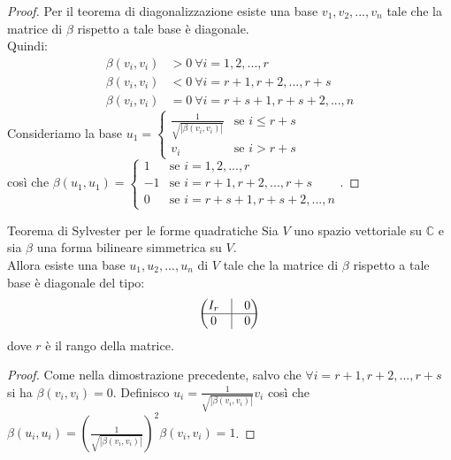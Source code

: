 \documentclass[a4paper]{article}
\theoremstyle{definition}
\begin{document}
	\begin{proof}
		Per il teorema di diagonalizzazione esiste una base $v_1, v_2, ..., v_n$ tale che la matrice di $\beta$ rispetto a tale base è diagonale. \\
		Quindi:
		\begin{align*}
			\beta(v_i, v_i) &> 0 \ \forall i = 1, 2, ..., r \\
			\beta(v_i, v_i) &< 0 \ \forall i = r + 1, r + 2, ..., r + s \\
			\beta(v_i, v_i) &= 0 \ \forall i = r + s + 1, r + s + 2, ..., n
		\end{align*}
		Consideriamo la base $u_1 = \begin{cases}
			\frac{1}{\sqrt{|\beta(v_i, v_i)|}} & \text{se } i \le r + s \\
			v_i & \text{se } i > r + s
		\end{cases}$ \\
		così che $\beta(u_1, u_1) = \begin{cases}
			1 & \text{se } i = 1, 2, ..., r \\
			-1 & \text{se } i = r + 1, r + 2, ..., r + s \\
			0 & \text{se } i = r + s + 1, r + s + 2, ..., n
		\end{cases}$.
	\end{proof}


	\begin{teo}{Teorema di Sylvester per le forme quadratiche}{}
		Sia $V$ uno spazio vettoriale su $\mathbb{C}$ e sia $\beta$ una forma bilineare simmetrica su $V$. \\
		Allora esiste una base $u_1, u_2, ..., u_n$ di $V$ tale che la matrice di $\beta$ rispetto a tale base è diagonale del tipo:
		\begin{align*}
			\begin{pmatrix}
				I_r & \vline & 0 \\
				\hline
				0 & \vline & 0
			\end{pmatrix}
		\end{align*}
		dove $r$ è il rango della matrice.
	\end{teo}

	\begin{proof}
		Come nella dimostrazione precedente, salvo che $\forall i = r + 1, r + 2, ..., r + s$ si ha $\beta(v_i, v_i) = 0$.
		Definisco $u_i = \frac{1}{\sqrt{|\beta(v_i, v_i)|}}v_i$ così che $\beta(u_i, u_i) = (\frac{1}{\sqrt{|\beta(v_i, v_i)|}})^2\beta(v_i, v_i) = 1$.
	\end{proof}
\end{document}
